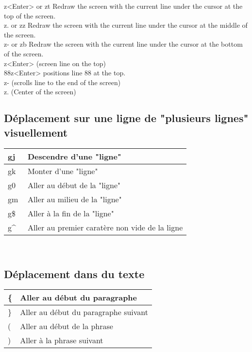 \documentclass{article}
\begin{document}
z<Enter> or zt Redraw the screen with the current line under the cursor at the top of the screen.\\
z.  or zz Redraw the screen with the current line under the cursor at the middle of the screen.\\
z- or zb Redraw the screen with the current line under the cursor at the bottom of the screen.\\

z<Enter> (screen line on the top)\\
88z<Enter> positions line 88 at the top.\\
z- (scrolls line to the end of the screen)\\
z. (Center of the screen)

\subsection{Déplacement sur une ligne de "plusieurs lignes" visuellement }
\begin{tabular}{|p{3cm}| l| }
\hline
gj & Descendre d'une "ligne"\\ \hline
gk & Monter d'une "ligne"\\ \hline
g0 & Aller au début de la "ligne"\\ \hline
gm & Aller au milieu de la "ligne"\\ \hline
g\$ & Aller à la fin de la "ligne"\\ \hline
g\^~ & Aller au premier caratère non vide de la ligne\\ \hline
\end{tabular}\\

\subsection{Déplacement dans du texte}
\begin{tabular}{|p{3cm}| l| }\hline
\{ & Aller au début du paragraphe \\ \hline
\} & Aller au début du paragraphe suivant \\ \hline
( & Aller au début de la phrase \\ \hline
) & Aller à la phrase suivant \\ \hline
\end{tabular}\\
\end{document}
